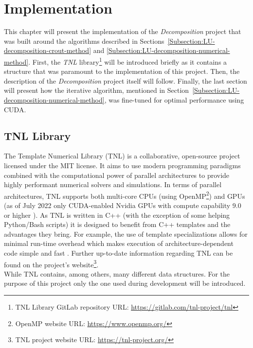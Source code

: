\chapter{Implementation \TO}\label{Chapter:implementation-introduction}
This chapter will present the implementation of the \textit{Decomposition} project that was built around the algorithms described in Sections~\ref{Subsection:LU-decomposition-crout-method} and \ref{Subsection:LU-decomposition-numerical-method}. First, the \textit{TNL} library\footnote{TNL Library GitLab repository URL: \url{https://gitlab.com/tnl-project/tnl}} will be introduced briefly as it contains a structure that was paramount to the implementation of this project. Then, the description of the \textit{Decomposition} project itself will follow. Finally, the last section will present how the iterative algorithm, mentioned in Section~\ref{Subsection:LU-decomposition-numerical-method}, was fine-tuned for optimal performance using CUDA.

\section{TNL Library \TO}\label{Section:implementation-tnl-library}
The Template Numerical Library (TNL) is a collaborative, open-source project licensed under the MIT license. It aims to use modern programming paradigms combined with the computational power of parallel architectures to provide highly performant numerical solvers and simulations. In terms of parallel architectures, TNL supports both multi-core CPUs (using OpenMP\footnote{OpenMP website URL: \url{https://www.openmp.org/}}) and GPUs (as of July 2022 only CUDA-enabled Nvidia GPUs with compute capability 9.0 or higher \cite{Ednu6dyrkWKz1Bv2}). As TNL is written in C++ (with the exception of some helping Python/Bash scripts) it is designed to benefit from C++ templates and the advantages they bring. For example, the use of template specializations allows for minimal run-time overhead which makes execution of architecture-dependent code simple and fast \cite{Oberhuber20210210}. Further up-to-date information regarding TNL can be found on the project's website\footnote{TNL project website URL: \url{https://tnl-project.org/}}. \\
While TNL contains, among others, many different data structures. For the purpose of this project only the one used during development will be introduced.

